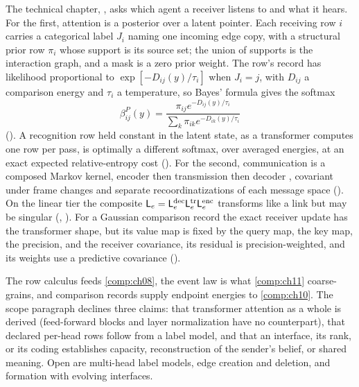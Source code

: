 The technical chapter, , asks which agent a receiver listens to and what it
hears. For the first, attention is a posterior over a latent pointer. Each receiving row $i$ carries a
categorical label $J_i$ naming one incoming edge copy, with a structural prior row $\pi_i$ whose support is its
source set; the union of supports is the interaction graph, and a mask is a zero prior weight. The row's record
has likelihood proportional to $\exp[-D_{ij}(y)/\tau_i]$ when $J_i=j$, with $D_{ij}$ a comparison energy and
$\tau_i$ a temperature, so Bayes' formula gives the softmax
\[
\beta^P_{ij}(y)=\frac{\pi_{ij}e^{-D_{ij}(y)/\tau_i}}{\sum_k\pi_{ik}e^{-D_{ik}(y)/\tau_i}}
\]
(). A recognition row held constant in the latent state, as a transformer computes
one row per pass, is optimally a different softmax, over averaged energies, at an exact expected relative-entropy
cost (). For the second, communication is a composed Markov kernel,
encoder then transmission then decoder \citep{Shannon1948}, covariant under frame changes and separate
recoordinatizations of each message space (). On the linear tier the composite
$\mathsf L_e=\mathsf L^{\rm dec}_e\mathsf L^{\rm tr}_e\mathsf L^{\rm enc}_e$ transforms like a link but may be
singular (, ). For a Gaussian comparison record the
exact receiver update has the transformer shape, but its value map is fixed by the query map, the key map, the
precision, and the receiver covariance, its residual is precision-weighted, and its weights use a predictive
covariance ().

The row calculus feeds \cref{comp:ch08}, the event law is what \cref{comp:ch11} coarse-grains, and comparison
records supply endpoint energies to \cref{comp:ch10}. The scope paragraph declines three claims: that transformer
attention as a whole is derived (feed-forward blocks and layer normalization have no counterpart), that declared
per-head rows follow from a label model, and that an interface, its rank, or its coding establishes capacity,
reconstruction of the sender's belief, or shared meaning. Open are multi-head label models, edge creation and
deletion, and formation with evolving interfaces.

